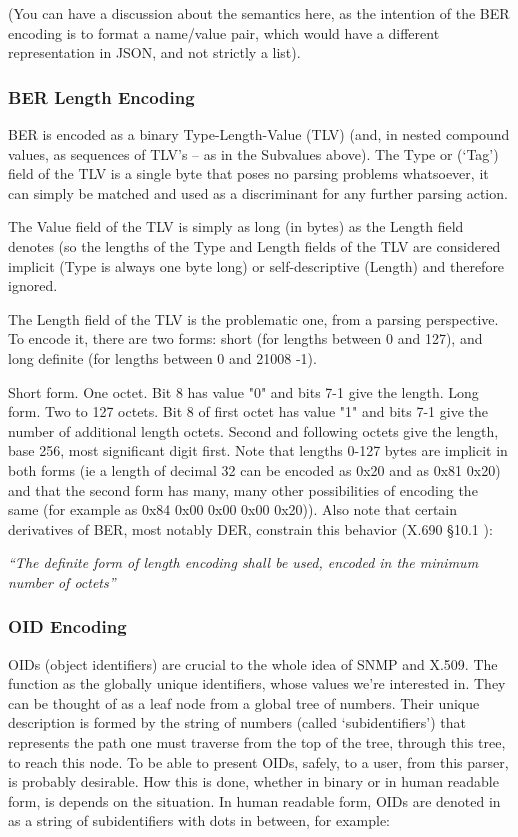 (You can have a discussion about the semantics here, as the intention of
the BER encoding is to format a name/value pair, which would have a
different representation in JSON, and not strictly a list).

\subsubsection{BER Length Encoding}
BER is encoded as a binary Type-Length-Value (TLV) (and, in nested 
compound values, as sequences of TLV’s – as in the Subvalues above).
The Type or (‘Tag’) field of the TLV is a single byte that poses no 
parsing problems whatsoever, it can simply be matched and used as a 
discriminant for any further parsing action.

The Value field of the TLV is simply as long (in bytes) as the Length 
field denotes (so the lengths of the Type and Length fields of the TLV are 
considered implicit (Type is always one byte long) or self-descriptive 
(Length) and therefore ignored.

The Length field of the TLV is the problematic one, from a parsing 
perspective. To encode it, there are two forms: short (for lengths between 
0 and 127), and long definite (for lengths between 0 and 21008 -1).
 
Short form. One octet. Bit 8 has value "0" and bits 7-1 give the length. 
Long form. Two to 127 octets. Bit 8 of first octet has value "1" and bits 
7-1 give the number of additional length octets. Second and following 
octets give the length, base 256, most significant digit first.
\cite{bib:x690}
Note that lengths 0-127 bytes are implicit in both forms (ie a length of 
decimal 32 can be encoded as 0x20 and as 0x81 0x20) and that the second 
form has many, many other possibilities of encoding the same (for example 
as 0x84 0x00 0x00 0x00 0x20)). Also note that certain derivatives of BER, 
most notably DER, constrain this behavior (X.690 §10.1 \cite{bib:x690}):

\textit{“The definite form of 
length encoding shall be used, encoded in the minimum number of octets”}

\subsubsection{OID Encoding}

OIDs (object identifiers) are crucial to the whole idea of SNMP and X.509. 
The function as the globally unique identifiers, whose values we’re 
interested in. They can be thought of as a leaf node from a global tree of 
numbers. Their unique description is formed by the string of numbers 
(called ‘subidentifiers’) that represents the path one must traverse 
from the top of the tree, through this tree, to reach this node.
To be able to present OIDs, safely, to a user, from this parser, is 
probably desirable. How this is done, whether in binary or in human 
readable form, is depends on the situation. In human readable form, OIDs 
are denoted in as a string of subidentifiers with dots in between,
for example:


